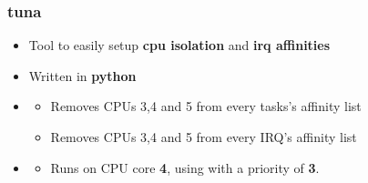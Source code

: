 \begin{frame}
	\frametitle{tuna}
	\begin{itemize}
		\item Tool to easily setup \textbf{cpu isolation} and \textbf{irq affinities}
		\item Written in \textbf{python}
		\item {}
			\begin{itemize}
				\item Removes CPUs 3,4 and 5 from every tasks's affinity list
				\item Removes CPUs 3,4 and 5 from every IRQ's affinity list
			\end{itemize}
		\item {}
			\begin{itemize}
				\item Runs  on CPU core \textbf{4}, using  with a priority of \textbf{3}.
			\end{itemize}
	\end{itemize}
\end{frame}



